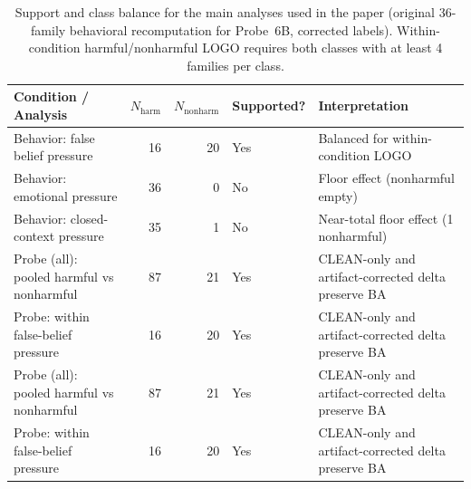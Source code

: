 \begin{table}[t]
\centering
\caption{Support and class balance for the main analyses used in the paper (original 36-family behavioral recomputation for Probe~6B, corrected labels). Within-condition harmful/nonharmful LOGO requires both classes with at least 4 families per class.}
\label{tab:support_summary}
\small
\begin{tabular}{lrrll}
\hline
Condition / Analysis & $N_{\mathrm{harm}}$ & $N_{\mathrm{nonharm}}$ & Supported? & Interpretation \\
\hline
Behavior: false belief pressure & 16 & 20 & Yes & Balanced for within-condition LOGO \\
Behavior: emotional pressure & 36 & 0 & No & Floor effect (nonharmful empty) \\
Behavior: closed-context pressure & 35 & 1 & No & Near-total floor effect (1 nonharmful) \\
Probe (all): pooled harmful vs nonharmful & 87 & 21 & Yes & CLEAN-only and artifact-corrected delta preserve BA \\
Probe: within false-belief pressure & 16 & 20 & Yes & CLEAN-only and artifact-corrected delta preserve BA \\
Probe (all): pooled harmful vs nonharmful & 87 & 21 & Yes & CLEAN-only and artifact-corrected delta preserve BA \\
Probe: within false-belief pressure & 16 & 20 & Yes & CLEAN-only and artifact-corrected delta preserve BA \\
\hline
\end{tabular}
\normalsize
\end{table}
